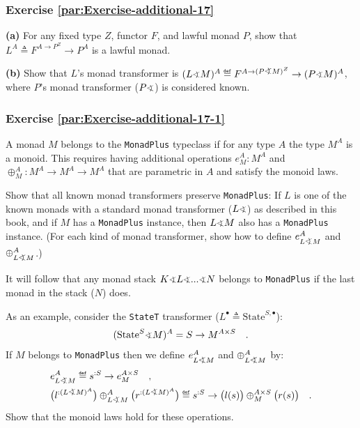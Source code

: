 \subsubsection{Exercise \label{par:Exercise-additional-17}\ref{par:Exercise-additional-17}}

\textbf{(a)} For any fixed type $Z$, functor $F$, and lawful monad
$P$, show that $L^{A}\triangleq F^{A\rightarrow P^{Z}}\rightarrow P^{A}$
is a lawful monad.

\textbf{(b)} Show that $L$\textsf{'}s monad transformer is $(L\varangle M)^{A}\triangleq F^{A\rightarrow(P\varangle M)^{Z}}\rightarrow(P\varangle M)^{A}$,
where $P$\textsf{'}s monad transformer ($P\varangle$) is considered known.

\subsubsection{Exercise \label{par:Exercise-additional-17-1}\ref{par:Exercise-additional-17-1}}

A monad $M$ belongs to the \lstinline!MonadPlus! typeclass if for
any type $A$ the type $M^{A}$ is a monoid. This requires having
additional operations $e_{M}^{A}:M^{A}$ and $\oplus_{M}^{A}:M^{A}\rightarrow M^{A}\rightarrow M^{A}$
that are parametric in $A$ and satisfy the monoid laws.

Show that all known monad transformers preserve \lstinline!MonadPlus!:
If $L$ is one of the known monads with a standard monad transformer
($L\varangle$) as described in this book, and if $M$ has a \lstinline!MonadPlus!
instance, then $L\varangle M$ also has a \lstinline!MonadPlus! instance.
(For each kind of monad transformer, show how to define $e_{L\varangle M}^{A}$
and $\oplus_{L\varangle M}^{A}$.)

It will follow that any monad stack $K\varangle L\varangle...\varangle N$
belongs to \lstinline!MonadPlus! if the last monad in the stack ($N$)
does.

As an example, consider the \lstinline!StateT! transformer ($L^{\bullet}\triangleq\text{State}^{S,\bullet}$):
\[
(\text{State}^{S}\varangle M)^{A}=S\rightarrow M^{A\times S}\quad.
\]
If $M$ belongs to \lstinline!MonadPlus! then we define $e_{L\varangle M}^{A}$
and $\oplus_{L\varangle M}^{A}$ by:
\begin{align*}
 & e_{L\varangle M}^{A}\triangleq s^{:S}\rightarrow e_{M}^{A\times S}\quad,\\
 & \big(l^{:(L\varangle M)^{A}}\big)\oplus_{L\varangle M}^{A}\big(r^{:(L\varangle M)^{A}}\big)\triangleq s^{:S}\rightarrow\big(l(s)\big)\oplus_{M}^{A\times S}\big(r(s)\big)\quad.
\end{align*}
Show that the monoid laws hold for these operations. 

